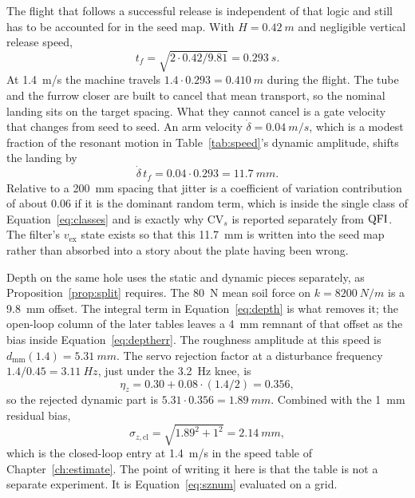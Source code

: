 The flight that follows a successful release is independent of that logic and still has to be accounted for in the seed map. With \(H=\SI{0.42}{m}\) and negligible vertical release speed,
\begin{equation}
\label{eq:tfnum}
t_f = \sqrt{2\cdot 0.42/9.81} = \SI{0.293}{s}.
\end{equation}
At \SI{1.4}{m/s} the machine travels \(1.4\cdot 0.293=\SI{0.410}{m}\) during the flight. The tube and the furrow closer are built to cancel that mean transport, so the nominal landing sits on the target spacing. What they cannot cancel is a gate velocity that changes from seed to seed. An arm velocity \(\dot{\delta}=\SI{0.04}{m/s}\), which is a modest fraction of the resonant motion in Table~\ref{tab:speed}'s dynamic amplitude, shifts the landing by
\begin{equation}
\label{eq:jitternum}
\dot{\delta}\, t_f = 0.04\cdot 0.293 = \SI{11.7}{mm}.
\end{equation}
Relative to a \SI{200}{mm} spacing that jitter is a coefficient of variation contribution of about \num{0.06} if it is the dominant random term, which is inside the single class of Equation~\eqref{eq:classes} and is exactly why \(\mathrm{CV}_s\) is reported separately from \(\mathrm{QFI}\). The filter's \(v_{\mathrm{ex}}\) state exists so that this \SI{11.7}{mm} is written into the seed map rather than absorbed into a story about the plate having been wrong.

Depth on the same hole uses the static and dynamic pieces separately, as Proposition~\ref{prop:split} requires. The \SI{80}{N} mean soil force on \(k=\SI{8200}{N/m}\) is a \SI{9.8}{mm} offset. The integral term in Equation~\eqref{eq:depth} is what removes it; the open-loop column of the later tables leaves a \SI{4}{mm} remnant of that offset as the bias inside Equation~\eqref{eq:deptherr}. The roughness amplitude at this speed is \(d_{\mathrm{mm}}(1.4)=\SI{5.31}{mm}\). The servo rejection factor at a disturbance frequency \(1.4/0.45=\SI{3.11}{Hz}\), just under the \SI{3.2}{Hz} knee, is
\begin{equation}
\label{eq:etaz}
\eta_z = 0.30 + 0.08\cdot(1.4/2) = 0.356,
\end{equation}
so the rejected dynamic part is \(5.31\cdot 0.356=\SI{1.89}{mm}\). Combined with the \SI{1}{mm} residual bias,
\begin{equation}
\label{eq:sznum}
\sigma_{z,\mathrm{cl}} = \sqrt{1.89^2 + 1^2} = \SI{2.14}{mm},
\end{equation}
which is the closed-loop entry at \SI{1.4}{m/s} in the speed table of Chapter~\ref{ch:estimate}. The point of writing it here is that the table is not a separate experiment. It is Equation~\eqref{eq:sznum} evaluated on a grid.

